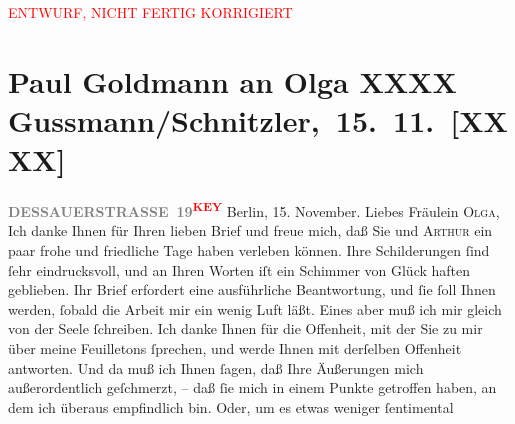 
\begin{center}
            \textcolor{red}{ENTWURF, NICHT FERTIG KORRIGIERT}
                      \end{center}
            
         
         \renewcommand{\erwaehntePersonen}{Personen: Gerhart Hauptmann, Olga Schnitzler, Elisabeth Steinrück}
         \renewcommand{\erwaehnteOrte}{Orte: Berlin, Wien}
         \renewcommand{\erwaehnteWerke}{}
               \section[ Paul Goldmann an Olga XXXX Gussmann/Schnitzler, 15. 11. {[}XXXX{]}]{ Paul Goldmann an Olga XXXX Gussmann/Schnitzler, 15. 11. {[}XXXX{]}}\nopagebreak{}\rehead{ }\begin{ledgroupsized}[t]{13cm}\normalsize\beginnumbering \toendnotes[C]{\smallbreak\pagebreak[2]} 
\toendnotes[C]{\smallbreak}\pstart
           \noindent{}{\pb}\pend
           \textcolor{gray}{\textbf{DESSAUERSTRASSE 19}}\textcolor{red}{\textsuperscript{\textbf{KEY}}}\pstart
           Berlin, 15. November.\pend
           \pstart{}Liebes Fräulein \textsc{Olga},\pend\pstart
           Ich danke Ihnen für Ihren lieben Brief und freue mich, daß Sie und \textsc{Arthur} ein paar frohe und friedliche Tage haben verleben können. Ihre Schilderungen
               ſind ſehr eindrucksvoll, und an Ihren Worten iſt ein Schimmer von Glück haften
               geblieben.\pend
           \pstart
           Ihr Brief erfordert eine ausführliche Beantwortung, und ſie ſoll Ihnen werden, ſobald
               die Arbeit mir ein wenig Luft läßt.\pend
           \pstart
           Eines aber muß ich mir gleich von der Seele ſchreiben. Ich danke Ihnen für {\pb}die Offenheit, mit der Sie zu
               mir über meine Feuilletons ſprechen, und werde Ihnen mit derſelben Offenheit
               antworten. Und da muß ich Ihnen ſagen, daß Ihre Äußerungen mich außerordentlich
               geſchmerzt, – daß ſie mich in einem Punkte getroffen haben, \strikeout{\textcolor{gray}{w}} an dem ich überaus empfindlich bin. Oder, um es etwas weniger ſentimental

\end{ledgroupsized}
